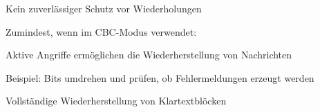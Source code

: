 \documentclass[a4paper]{article}
\begin{document}
\begin{multicols}{3}
\begin{itemize*}
            \begin{itemize*}
                  \item Kein zuverlässiger Schutz vor Wiederholungen
                  \item Zumindest, wenn im CBC-Modus verwendet:
                  \begin{itemize*}
                        \item Aktive Angriffe ermöglichen die Wiederherstellung von Nachrichten
                        \item Beispiel: Bits umdrehen und prüfen, ob Fehlermeldungen erzeugt werden
                        \item Vollständige Wiederherstellung von Klartextblöcken
                  \end{itemize*}
            \end{itemize*}
      \end{itemize*}



\end{multicols}
\end{document}
